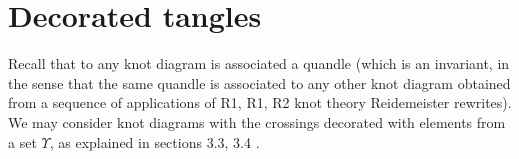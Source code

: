 \section{Decorated tangles}

Recall that to any knot diagram is associated a quandle (which is an invariant, in the sense that the same quandle is associated to any other knot diagram obtained from a sequence of applications of R1, R1, R2 knot theory Reidemeister rewrites). We may consider knot diagrams with the crossings decorated with elements from a set $\Upsilon$, as explained in sections 3.3, 3.4 \cite{buligachora}.

